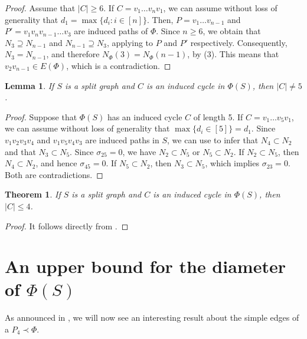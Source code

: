 \documentclass[11pt]{elsarticle}
\newtheorem{theorem}{Theorem}[section]
\newtheorem{lemma}[lemma]{Lemma}
\begin{document}
\begin{proof}
	Assume that $|C|\geq 6$. If $C=v_1\ldots v_nv_1$, we can assume without loss of generality that $d_1=\max\{d_i:i\in[n]\}$. Then, $P=v_1\ldots v_{n-1}$ and $P'=v_1v_n v_{n-1}\ldots v_3$ are induced paths of $\Phi$. Since $n\geq 6$, we obtain that $N_3\supseteq N_{n-1}$ and $N_{n-1}\supseteq N_3$, applying  to $P$ and $P'$ respectively. Consequently, $N_3=N_{n-1}$, and therefore $N_{\Phi}(3)=N_{\Phi}(n-1)$, by (3). This means that $v_2v_{n-1} \in E(\Phi)$, which is a contradiction.
\end{proof}

\begin{lemma}
	\label{no.hay.C_5.en.Phi}
	If $S$ is a split graph and $C$ is an induced cycle in $\Phi(S)$, then $|C|\neq 5$.
\end{lemma}

\begin{proof}
	Suppose that $\Phi(S)$ has an induced cycle $C$ of length 5. If $C=v_1\ldots v_5v_1$, we can assume without loss of generality that $\max\{d_i\in[5]\}=d_1$. Since $v_1v_2v_3v_4$ and $v_1v_5v_4v_3$ are induced paths in $S$, we can use  to infer that $N_4\subset N_2$ and that $N_3\subset N_5$. Since $\sigma_{25}=0$, we have $N_2\subset N_5$ or $N_5\subset N_2$. If $N_2\subset N_5$, then $N_4\subset N_2$, and hence $\sigma_{45}=0$. If $N_5\subset N_2$, then $N_3\subset N_5$, which implies $\sigma_{23}=0$. Both are contradictions.
\end{proof}

\begin{theorem}
	\label{ciclos.inducidos.en.Phi}
	If $S$ is a split graph and $C$ is an induced cycle in $\Phi(S)$, then $|C|\leq 4$.
\end{theorem}

\begin{proof}
	It follows directly from .
\end{proof}


\section{An upper bound for the diameter of $\Phi(S)$}
\label{sec:upp_bound_diam_Phi}

As announced in , we will now see an interesting result about the simple edges of a $P_4\prec\Phi$. 
\end{document}
